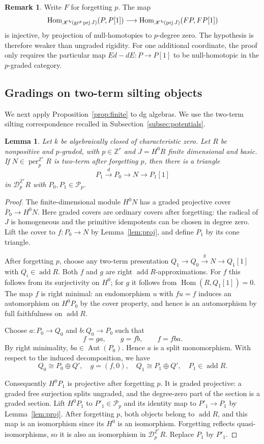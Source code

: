 \documentclass[12pt,a4paper,english,reqno]{amsart}
\theoremstyle{plain}
\newtheorem{lem}[thm]{Lemma}
\theoremstyle{definition}
\newtheorem{rmk}[thm]{Remark}
\numberwithin{equation}{section}
\newcommand{\prpref}[1]{Proposition~\ref{#1}}
\newcommand{\lemref}[1]{Lemma~\ref{#1}}
\def\Hom{\operatorname{Hom}}
\def\prj{\operatorname{prj}}
\def\add{\operatorname{add}}
\def\Kb{{\mathcal K}^{\text{\rm b}}}
\def\perf{\operatorname{per}}
\def\calD{{\mathcal D}}
\def\bbZ{{\mathbb Z}}
\def\iso{\cong}
\def\ds{\oplus}
\def\ya#1{\xrightarrow{#1}}
\def\gr{\operatorname{gr}}
\begin{document}
\begin{rmk}
Write $F$ for forgetting $p$. The map
\[
 \Hom_{\Kb(\gr^p\prj J)}(P,P[1])
 \longrightarrow\Hom_{\Kb(\prj J)}(FP,FP[1])
\]
is injective, by projection of null-homotopies to $p$-degree zero. The hypothesis is therefore weaker than ungraded rigidity. For one additional coordinate, the proof only requires the particular map $Ed-dE:P\to P[1]$ to be null-homotopic in the $p$-graded category.
\end{rmk}

\subsection{Gradings on two-term silting objects}
We next apply \prpref{prop:finite} to dg algebras. We use the two-term silting correspondence recalled in Subsection~\ref{subsec:potentials}.
\begin{lem}\label{lem:presentation}
Let $k$ be algebraically closed of characteristic zero. Let $R$ be nonpositive and $p$-graded, with $p\in\bbZ^r$ and $J=H^0R$ finite dimensional and basic. If $N\in\perf^{\bbZ^r}_pR$ is two-term after forgetting $p$, then there is a triangle
\[
 P_1\ya{d}P_0\longrightarrow N\longrightarrow P_1[1]
\]
in $\calD^{\bbZ^r}_pR$ with $P_0,P_1\in\mathcal P_p$.
\end{lem}
\begin{proof}
The finite-dimensional module $H^0N$ has a graded projective cover
$\overline P_0\to H^0N$. Here graded covers are ordinary covers after forgetting: the radical of $J$ is homogeneous and the primitive idempotents can be chosen in degree zero. Lift the cover to $f:P_0\to N$ by \lemref{lem:proj}, and define $P_1$ by its cone triangle.

After forgetting $p$, choose any two-term presentation
$Q_1\to Q_0\ya{g}N\to Q_1[1]$ with $Q_i\in\add R$.
Both $f$ and $g$ are right $\add R$-approximations. For $f$ this follows from its surjectivity on $H^0$; for $g$ it follows from $\Hom(R,Q_1[1])=0$. The map $f$ is right minimal: an endomorphism $u$ with $fu=f$ induces an automorphism on $H^0P_0$ by the cover property, and hence is an automorphism by full faithfulness on $\add R$.

Choose $a:P_0\to Q_0$ and $b:Q_0\to P_0$ such that
\[
 f=ga,
 \qquad g=fb,
 \qquad f=fba.
\]
By right minimality, $ba\in\operatorname{Aut}(P_0)$. Hence $a$ is a split monomorphism. With respect to the induced decomposition, we have
\[
 Q_0\iso P_0\ds Q',\quad g=(f,0),\quad
 Q_1\iso P_1\ds Q',\quad P_1\in\add R.
\]

Consequently $H^0P_1$ is projective after forgetting $p$. It is graded projective: a graded free surjection splits ungraded, and the degree-zero part of the section is a graded section. Lift $H^0P_1$ to $P'_1\in\mathcal P_p$ and its identity map to $P'_1\to P_1$ by \lemref{lem:proj}. After forgetting $p$, both objects belong to $\add R$, and this map is an isomorphism since its $H^0$ is an isomorphism. Forgetting reflects quasi-isomorphisms, so it is also an isomorphism in $\calD^{\bbZ^r}_pR$. Replace $P_1$ by $P'_1$.
\end{proof}
\end{document}
